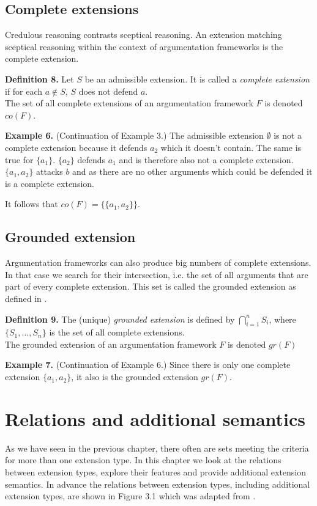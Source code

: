 \documentclass[draft,final]{vutinfth} %
\newcommand{\hl}{\par\vspace{6pt}} %
\newcommand{\cl}{\par\vspace{12pt}} %
\begin{document}
\section{Complete extensions}

Credulous reasoning contrasts sceptical reasoning. An extension matching sceptical reasoning within the context of argumentation frameworks is the complete extension.\cl

\textbf{Definition 8.} Let $S$ be an admissible extension. It is called a \emph{complete extension} if for each $a\not\in S$, $S$ does not defend $a$.\\
The set of all complete extensions of an argumentation framework $F$ is denoted $co(F)$.\cl

\textbf{Example 6.} (Continuation of Example 3.) The admissible extension $\emptyset$ is not a complete extension because it defends $a_2$ which it doesn't contain. The same is true for $\{a_1\}$. $\{a_2\}$ defends $a_1$ and is therefore also not a complete extension.\\
$\{a_1,a_2\}$ attacks $b$ and as there are no other arguments which could be defended it is a complete extension.\hl
It follows that $co(F)=\{\{a_1,a_2\}\}$.\cl

\section{Grounded extension}

Argumentation frameworks can also produce big numbers of complete extensions. In that case we search for their intersection, i.e. the set of all arguments that are part of every complete extension. This set is called the grounded extension as defined in \cite{Egly}.\cl

\textbf{Definition 9.} The (unique) \emph{grounded extension} is defined by $\bigcap\limits_{i=1}^n{S_i}$, where $\{S_1,...,S_n\}$ is the set of all complete extensions.\\
The grounded extension of an argumentation framework $F$ is denoted $gr(F)$\cl

\textbf{Example 7.} (Continuation of Example 6.) Since there is only one complete extension $\{a_1,a_2\}$, it also is the grounded extension $gr(F)$.\cl

\chapter{Relations and additional semantics}

As we have seen in the previous chapter, there often are sets meeting the criteria for more than one extension type. In this chapter we look at the relations between extension types, explore their features and provide additional extension semantics. In advance the relations between extension types, including additional extension types, are shown in Figure 3.1 which was adapted from \cite{Gorogiannis}.\cl
\end{document}
